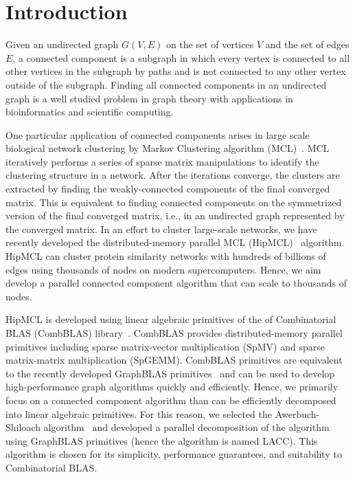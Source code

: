 \section{Introduction}
Given an undirected graph $G(V, E)$ on the set of vertices $V$ and the set of edges $E$, a connected component is a subgraph in which every vertex is connected to all other vertices in the subgraph by paths and is not connected to any other vertex outside of the subgraph.  
Finding all connected components in an undirected graph is a well studied problem in graph theory with applications in bioinformatics and scientific computing. 

One particular application of connected components arises in large scale biological network clustering by Markov Clustering algorithm (MCL)~\cite{van2000graph}. 
MCL iteratively performs a series of sparse matrix manipulations to identify the clustering structure in a network. 
After the iterations converge, the clusters are extracted by finding the weakly-connected components of the final converged matrix.  This is equivalent to finding connected components on the symmetrized version of the final converged matrix, i.e., in an undirected graph represented by the converged matrix. 
In an effort to cluster large-scale networks, we have recently developed the distributed-memory parallel MCL (HipMCL)~\cite{hipmcl} algorithm.
HipMCL can cluster protein similarity networks with hundreds of billions of edges using thousands of nodes on modern supercomputers. 
Hence, we aim develop a parallel connected component algorithm that can scale to thousands of nodes. 

HipMCL is developed using linear algebraic primitives of the of Combinatorial BLAS (CombBLAS) library~\cite{bulucc2011combinatorial}. 
CombBLAS provides distributed-memory parallel primitives including sparse matrix-vector multiplication (SpMV) and sparse matrix-matrix multiplication (SpGEMM). 
CombBLAS primitives are equivalent to the recently developed GraphBLAS primitives~\cite{bulucc2017design} and can be used to develop high-performance graph algorithms quickly and efficiently. 
Hence, we primarily focus on a connected component algorithm than can be efficiently decomposed into linear algebraic primitives. 
For this reason, we selected the Awerbuch-Shiloach algorithm~\cite{awerbuch1987new} and developed a parallel decomposition of the algorithm using GraphBLAS primitives (hence the algorithm is named LACC). This algorithm is chosen for its simplicity, performance guarantees, and suitability to Combinatorial BLAS. 





